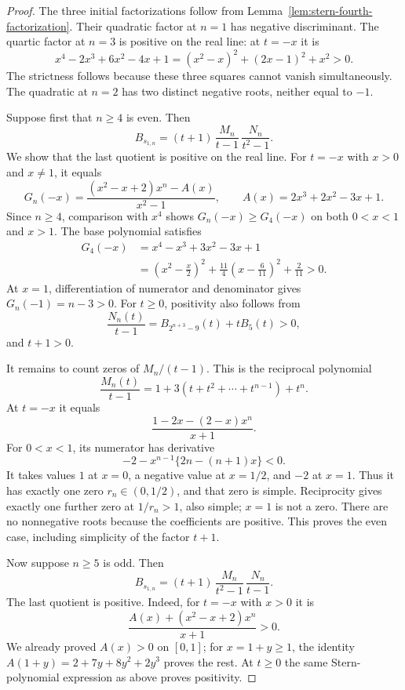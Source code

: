 \documentclass[11pt,a4paper]{article}
\theoremstyle{definition}\newtheorem{definition}[theorem]{Definition}
\theoremstyle{remark}\newtheorem{remark}[theorem]{Remark}
\begin{document}
\begin{proof}
The three initial factorizations follow from
Lemma~\ref{lem:stern-fourth-factorization}. Their quadratic factor at
$n=1$ has negative discriminant. The quartic factor at $n=3$ is positive
on the real line: at $t=-x$ it is
\[
 x^4-2x^3+6x^2-4x+1
       =(x^2-x)^2+(2x-1)^2+x^2>0.
\]
The strictness follows because these three squares cannot vanish
simultaneously. The quadratic at $n=2$ has two distinct negative roots,
neither equal to $-1$.

Suppose first that $n\geq4$ is even. Then
\[
 B_{s_{1,n}}=(t+1)\,\frac{M_n}{t-1}\,\frac{N_n}{t^2-1}.
\]
We show that the last quotient is positive on the real line. For
$t=-x$ with $x>0$ and $x\ne1$, it equals
\[
 G_n(-x)=\frac{(x^2-x+2)x^n-A(x)}{x^2-1},
 \qquad A(x)=2x^3+2x^2-3x+1.
\]
Since $n\geq4$, comparison with $x^4$ shows $G_n(-x)\geq G_4(-x)$
on both $0<x<1$ and $x>1$. The base polynomial satisfies
\[
\begin{split}
 G_4(-x)&=x^4-x^3+3x^2-3x+1\\
 &=\left(x^2-\frac x2\right)^2
    +\frac{11}{4}\left(x-\frac6{11}\right)^2+\frac2{11}>0.
\end{split}
\]
At $x=1$, differentiation of numerator and denominator gives
$G_n(-1)=n-3>0$. For $t\geq0$, positivity also follows from
\[
 \frac{N_n(t)}{t-1}=B_{2^{n+3}-9}(t)+tB_5(t)>0,
\]
and $t+1>0$.

It remains to count zeros of $M_n/(t-1)$. This is the reciprocal
polynomial
\[
 \frac{M_n(t)}{t-1}=1+3(t+t^2+\cdots+t^{n-1})+t^n.
\]
At $t=-x$ it equals
\[
 \frac{1-2x-(2-x)x^n}{x+1}.
\]
For $0<x<1$, its numerator has derivative
\[
 -2-x^{n-1}\{2n-(n+1)x\}<0.
\]
It takes values $1$ at $x=0$, a negative value at $x=1/2$, and
$-2$ at $x=1$. Thus it has exactly one zero $r_n\in(0,1/2)$,
and that zero is simple. Reciprocity gives exactly one further zero
at $1/r_n>1$, also simple; $x=1$ is not a zero. There are no
nonnegative roots because the coefficients are positive. This proves
the even case, including simplicity of the factor $t+1$.

Now suppose $n\geq5$ is odd. Then
\[
 B_{s_{1,n}}=(t+1)\,\frac{M_n}{t^2-1}\,\frac{N_n}{t-1}.
\]
The last quotient is positive. Indeed, for $t=-x$ with $x>0$ it is
\[
 \frac{A(x)+(x^2-x+2)x^n}{x+1}>0.
\]
We already proved $A(x)>0$ on $[0,1]$; for $x=1+y\geq1$, the
identity $A(1+y)=2+7y+8y^2+2y^3$ proves the rest. At $t\geq0$ the
same Stern-polynomial expression as above proves positivity.


\end{proof}
\end{document}
